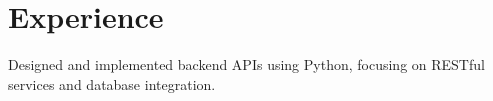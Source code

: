 \section{Experience}
\item Designed and implemented backend APIs using Python, focusing on RESTful services and database integration.